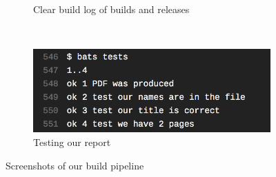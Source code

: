 \begin{figure}[ht]
\begin{subfigure}[h]{0.4\linewidth}
    \caption{Clear build log of builds and releases}
    \label{fig:ci-4}
  \end{subfigure}
  \\
  \begin{subfigure}[h]{0.4\linewidth}
    \centering
    \includegraphics[width=\linewidth]{ci-5.png}
    \caption{Testing our report}
    \label{fig:ci-5}
  \end{subfigure}
  \caption{Screenshots of our build pipeline}
  \label{fig:}
\end{figure}
